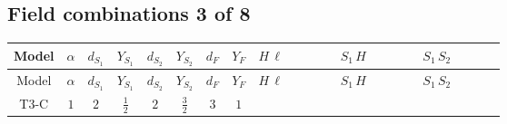 \documentclass[8pt]{article}
\begin{document}
\begin{landscape}
\subsection*{Field combinations 3 of 8}
\begin{longtable}{@{}cccccccc >{\raggedright\arraybackslash}p{0.21\linewidth} >{\raggedright\arraybackslash}p{0.21\linewidth} >{\raggedright\arraybackslash}p{0.21\linewidth}@{}}
\toprule
Model & $\alpha$ & $d_{S_1}$ & $Y_{S_1}$ & $d_{S_2}$ & $Y_{S_2}$ & $d_F$ & $Y_F$ & $H\,\ell$ & $S_1\,H$ & $S_1\,S_2$ \\
\midrule
\endfirsthead
\toprule
Model & $\alpha$ & $d_{S_1}$ & $Y_{S_1}$ & $d_{S_2}$ & $Y_{S_2}$ & $d_F$ & $Y_F$ & $H\,\ell$ & $S_1\,H$ & $S_1\,S_2$ \\
\midrule
\endhead
T3-C & $1$ & $2$ & $\frac{1}{2}$ & $2$ & $\frac{3}{2}$ & $3$ & $1$ & \scriptsize\adjustbox{max width=\linewidth}{$\begin{gathered} -\frac{2 \hbar  \overline{y_{1,i_1,r_1}} \overline{y_{2,i_2,r_1}} L_{a_4,i_2}{}^T\, C\, P_L\, L_{a_2,i_1} H_{a_1} H_{a_3} \lambda_5 \epsilon_{a_1,a_2} \epsilon_{a_3,a_4}}{3 \epsilon  M_F} \\ -\frac{2 \hbar  \overline{y_{1,i_1,r_1}} \overline{y_{2,i_2,r_1}} L_{a_4,i_2}{}^T\, C\, P_L\, L_{a_2,i_1} H_{a_1} H_{a_3} \lambda_5 \epsilon_{a_1,a_2} \epsilon_{a_3,a_4}}{3 M_F} \\ -\frac{2 \hbar  \overline{\lambda_5} \overline{L_{a_3,i_1}}\, C\, P_R\, \overline{L_{a_4,i_2}}{}^T y_{1,i_1,r_1} y_{2,i_2,r_1} \epsilon_{a_1,a_3} \epsilon_{a_2,a_4} H_{a_1}{}^{\dagger } H_{a_2}{}^{\dagger }}{3 \epsilon  M_F}\end{gathered}$} & \scriptsize\adjustbox{max width=\linewidth}{$\begin{gathered} -\frac{4 \hbar  \overline{y_{1,i_1,r_1}} \overline{Y_{e,i_2,i_3}} H_{a_1} S_{1,j_1} y_{1,i_2,r_1} Y_{e,i_1,i_3} H_{a_1}{}^{\dagger } S_{1,j_1}{}^{\dagger }}{\sqrt{3} \epsilon } \\ -\frac{4 \hbar  \overline{y_{1,i_1,r_1}} \overline{Y_{e,i_2,i_3}} H_{a_1} S_{1,j_1} y_{1,i_2,r_1} Y_{e,i_1,i_3} H_{a_1}{}^{\dagger } S_{1,j_1}{}^{\dagger }}{\sqrt{3}} \\ +\frac{2 \hbar  \overline{y_{1,i_1,r_1}} \overline{Y_{e,i_2,i_3}} H_{a_2} S_{1,j_2} y_{1,i_2,r_1} Y_{e,i_1,i_3} H_{a_1}{}^{\dagger } S_{1,j_1}{}^{\dagger } \mathcal{I}_{H1,a_1,a_2,j_1,j_2}{}^1}{\sqrt{3} \epsilon }\end{gathered}$} & \scriptsize\adjustbox{max width=\linewidth}{$\begin{gathered} +\frac{2 \hbar  \overline{y_{1,i_1,r_1}} \overline{y_{2,i_2,r_2}} S_{1,j_2} S_{2,j_1} y_{1,i_2,r_1} y_{2,i_1,r_2} S_{1,j_1}{}^{\dagger } S_{2,j_2}{}^{\dagger }}{3 \epsilon } \\ -\frac{10 \hbar  \overline{y_{1,i_1,r_1}} \overline{y_{2,i_2,r_2}} S_{1,j_1} S_{2,j_2} y_{1,i_2,r_1} y_{2,i_1,r_2} S_{1,j_1}{}^{\dagger } S_{2,j_2}{}^{\dagger }}{3 \epsilon } \\ -\frac{10}{3} \hbar  \overline{y_{1,i_1,r_1}} \overline{y_{2,i_2,r_1}} S_{1,j_2} S_{2,j_1} y_{1,i_2,r_2} y_{2,i_1,r_2} S_{1,j_1}{}^{\dagger } S_{2,j_2}{}^{\dagger }\end{gathered}$} \\

\end{longtable}
\end{landscape}
\end{document}

